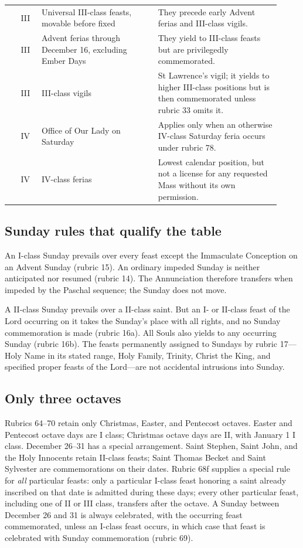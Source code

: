 \begin{longtable}{>{\centering\arraybackslash}p{0.045\linewidth}>{\centering\arraybackslash}p{0.07\linewidth}>{\raggedright\arraybackslash}p{0.39\linewidth}>{\raggedright\arraybackslash}p{0.41\linewidth}}
24 & III & Universal III-class feasts, movable before fixed & They precede early Advent ferias and III-class vigils.\\
25 & III & Advent ferias through December 16, excluding Ember Days & They yield to III-class feasts but are privilegedly commemorated.\\
26 & III & III-class vigils & St Lawrence's vigil; it yields to higher III-class positions but is then commemorated unless rubric 33 omits it.\\
\midrule
27 & IV & Office of Our Lady on Saturday & Applies only when an otherwise IV-class Saturday feria occurs under rubric 78.\\
28 & IV & IV-class ferias & Lowest calendar position, but not a license for any requested Mass without its own permission.\\
\bottomrule
\end{longtable}
\endgroup

\subsection{Sunday rules that qualify the table}

An I-class Sunday prevails over every feast except the Immaculate Conception on an Advent Sunday (rubric 15). An ordinary impeded Sunday is neither anticipated nor resumed (rubric 14). The Annunciation therefore transfers when impeded by the Paschal sequence; the Sunday does not move.

A II-class Sunday prevails over a II-class saint. But an I- or II-class feast of the Lord occurring on it takes the Sunday's place with all rights, and no Sunday commemoration is made (rubric 16a). All Souls also yields to any occurring Sunday (rubric 16b). The feasts permanently assigned to Sundays by rubric 17---Holy Name in its stated range, Holy Family, Trinity, Christ the King, and specified proper feasts of the Lord---are not accidental intrusions into Sunday.

\subsection{Only three octaves}

Rubrics 64--70 retain only Christmas, Easter, and Pentecost octaves. Easter and Pentecost octave days are I class; Christmas octave days are II, with January 1 I class. December 26--31 has a special arrangement. Saint Stephen, Saint John, and the Holy Innocents retain II-class feasts; Saint Thomas Becket and Saint Sylvester are commemorations on their dates. Rubric 68f supplies a special rule for \emph{all} particular feasts: only a particular I-class feast honoring a saint already inscribed on that date is admitted during these days; every other particular feast, including one of II or III class, transfers after the octave. A Sunday between December 26 and 31 is always celebrated, with the occurring feast commemorated, unless an I-class feast occurs, in which case that feast is celebrated with Sunday commemoration (rubric 69).

